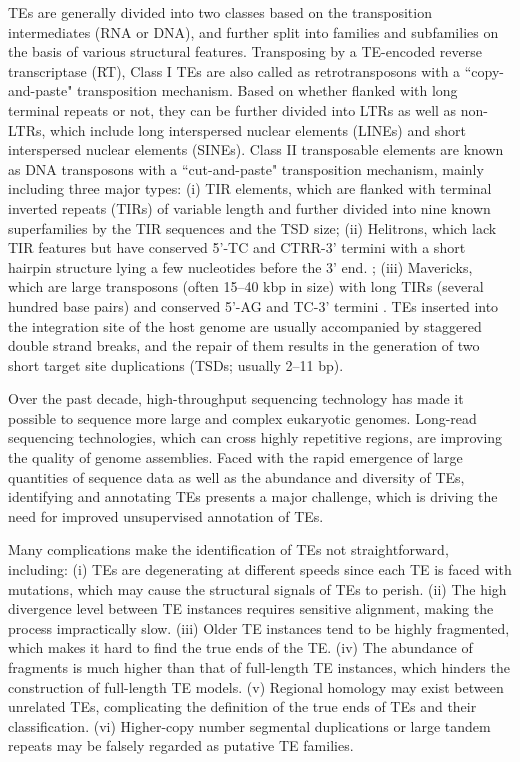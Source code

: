 \documentclass{bmcart}
\begin{document}
TEs are generally divided into two classes based on the transposition intermediates (RNA or DNA)\cite{finnegan1989eukaryotic}, and further split into families and subfamilies on the basis of various structural features\cite{wicker2007unified}. Transposing by a TE-encoded reverse transcriptase (RT), Class I TEs are also called as retrotransposons with a ``copy-and-paste" transposition mechanism. Based on whether flanked with long terminal repeats or not, they can be further divided into LTRs as well as non-LTRs, which include long interspersed nuclear elements (LINEs) and short interspersed nuclear elements (SINEs). Class II transposable elements are known as DNA transposons with a ``cut-and-paste" transposition mechanism, mainly including three major types: (i) TIR elements, which are flanked with terminal inverted repeats (TIRs) of variable length and further divided into nine known superfamilies by the TIR sequences and the TSD size\cite{wicker2007unified}; (ii) Helitrons, which lack TIR features but have conserved 5'-TC and CTRR-3' termini with a short hairpin structure lying a few nucleotides before the 3' end.  \cite{kapitonov2007helitrons}; (iii) Mavericks, which are large transposons (often 15–40 kbp in size) with long TIRs (several hundred base pairs) and conserved 5'-AG and TC-3' termini \cite{su2019tir}. TEs inserted into the integration site of the host genome are usually accompanied by staggered double strand breaks, and the repair of them results in the generation of two short target site duplications (TSDs; usually 2–11 bp)\cite{peterson2013mechanism}.

Over the past decade, high-throughput sequencing technology has made it possible to sequence more large and complex eukaryotic genomes. Long-read sequencing technologies, which can cross highly repetitive regions, are improving the quality of genome assemblies\cite{yasir2022long}. Faced with the rapid emergence of large quantities of sequence data as well as the abundance and diversity of TEs, identifying and annotating TEs presents a major challenge, which is driving the need for improved unsupervised annotation of TEs.

Many complications make the identification of TEs not straightforward, including: (i) TEs are degenerating at different speeds since each TE is faced with mutations, which may cause the structural signals of TEs to perish. (ii) The high divergence level between TE instances requires sensitive alignment, making the process impractically slow. (iii) Older TE instances tend to be highly fragmented, which makes it hard to find the true ends of the TE. (iv) The abundance of fragments is much higher than that of full-length TE instances, which hinders the construction of full-length TE models. (v) Regional homology may exist between unrelated TEs, complicating the definition of the true ends of TEs and their classification. (vi) Higher-copy number segmental duplications or large tandem repeats may be falsely regarded as putative TE families\cite{storer2022methodologies}.
\end{document}
